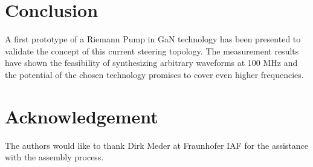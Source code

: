 \documentclass[journal]{IEEEtran}
\begin{document}
\section{Conclusion}
\label{sec:conclusion}
A first prototype of a Riemann Pump in GaN technology has been presented to validate the concept of this current steering topology.
The measurement results have shown the feasibility of synthesizing arbitrary waveforms at 100 MHz and the potential of the chosen technology promises to cover even higher frequencies.


\section*{Acknowledgement}
The authors would like to thank Dirk Meder at Fraunhofer IAF for the assistance with the assembly process.




\nocite{*}
\end{document}
